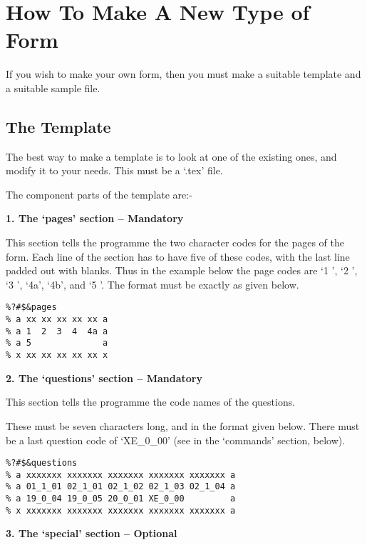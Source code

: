 \section{How To Make A New Type of Form}
\label{se:make}

If you wish to make your own form, then you must make a suitable template
and a suitable sample file. 

\subsection{The Template}

The best way to make a template is to look at one of the existing ones, and
modify it to your needs. This must be a `.tex' file. 

The component parts of the template are:-


\vspace*{0.2cm}
{\bf \large 1. The `pages' section -- Mandatory}
\vspace*{0.2cm}

This section tells the programme the two character codes for the pages of
the form. Each line of the section has to have five of these codes, with
the last line padded out with blanks. Thus in the example below the page
codes are `1 ', `2 ', `3 ', `4a', `4b', and `5 '. The format must be
exactly as given below. 

\begin{verbatim}
%?#$&pages
% a xx xx xx xx xx a
% a 1  2  3  4  4a a
% a 5              a
% x xx xx xx xx xx x
\end{verbatim}

\vspace*{0.2cm}
{\bf \large 2. The `questions' section -- Mandatory}
\vspace*{0.2cm}

This section tells the programme the code names of the questions. 

These must be seven characters long, and in the format given below. There
must be a last question code of `XE\_0\_00' (see in the `commands' section,
below). 

\begin{verbatim}
%?#$&questions
% a xxxxxxx xxxxxxx xxxxxxx xxxxxxx xxxxxxx a
% a 01_1_01 02_1_01 02_1_02 02_1_03 02_1_04 a
% a 19_0_04 19_0_05 20_0_01 XE_0_00         a
% x xxxxxxx xxxxxxx xxxxxxx xxxxxxx xxxxxxx a
\end{verbatim}

\vspace*{0.2cm}
{\bf \large 3. The `special' section -- Optional}
\vspace*{0.2cm}

